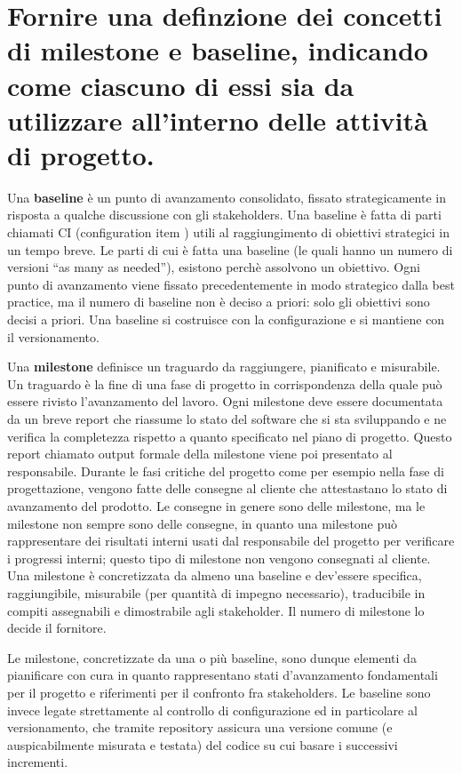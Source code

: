 \section{Fornire una definzione dei concetti di \textbf{milestone} e \textbf{baseline}, indicando come ciascuno di essi sia da utilizzare all'interno delle attività di progetto.}
Una \textbf{baseline} è un punto di avanzamento consolidato, fissato strategicamente in risposta a qualche discussione con gli stakeholders. Una baseline è fatta di parti chiamati CI (configuration item ) utili al raggiungimento di obiettivi strategici in un tempo breve. Le parti di cui è fatta una baseline (le quali hanno un numero di versioni “as many as needed”), esistono perchè assolvono un obiettivo.
Ogni punto di avanzamento viene fissato precedentemente in modo strategico dalla best practice, ma il numero di baseline non è deciso a priori:  solo gli obiettivi sono decisi a priori.
Una baseline si costruisce con la configurazione e si mantiene con il versionamento.

Una \textbf{milestone} definisce un traguardo da raggiungere, pianificato e misurabile. Un traguardo è la fine di una fase di progetto in corrispondenza della quale può essere rivisto l'avanzamento del lavoro. Ogni milestone deve essere documentata da un breve report che riassume lo stato del software che si sta sviluppando e ne verifica la completezza rispetto a quanto specificato nel piano di progetto.
Questo report chiamato output formale della milestone viene poi presentato al responsabile.
Durante le fasi critiche del progetto come per esempio nella fase di progettazione, vengono fatte delle consegne al cliente che attestastano lo stato di avanzamento del prodotto. Le consegne in genere sono delle milestone, ma le milestone non sempre sono delle consegne, in quanto una milestone può rappresentare dei risultati interni usati dal responsabile del progetto per verificare i progressi interni; questo tipo di milestone non vengono consegnati al cliente. Una milestone è concretizzata da almeno una baseline e dev'essere specifica, raggiungibile, misurabile (per quantità di impegno necessario), traducibile in compiti assegnabili e dimostrabile agli stakeholder. Il numero di milestone lo decide il fornitore.

Le milestone, concretizzate da una o più baseline, sono dunque elementi da pianificare con cura in quanto rappresentano stati d’avanzamento fondamentali per il progetto e riferimenti per il confronto fra stakeholders. Le baseline sono invece legate strettamente al controllo di configurazione ed in particolare al versionamento, che tramite repository assicura una versione comune (e auspicabilmente misurata e testata) del codice su cui basare i successivi incrementi.